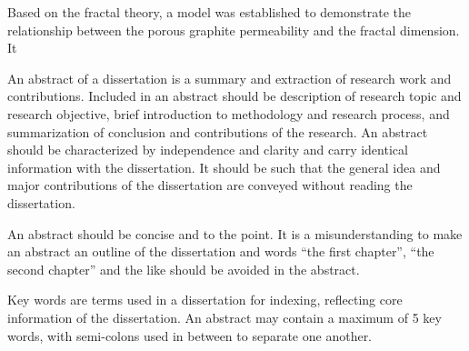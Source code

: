 \begin{eabstract}
Based on the fractal theory, a model was established to demonstrate the relationship between the porous graphite permeability and the fractal dimension. It 
   
   
   An abstract of a dissertation is a summary and extraction of research work
   and contributions. Included in an abstract should be description of research
   topic and research objective, brief introduction to methodology and research
   process, and summarization of conclusion and contributions of the
   research. An abstract should be characterized by independence and clarity and
   carry identical information with the dissertation. It should be such that the
   general idea and major contributions of the dissertation are conveyed without
   reading the dissertation.

   An abstract should be concise and to the point. It is a misunderstanding to
   make an abstract an outline of the dissertation and words ``the first
   chapter'', ``the second chapter'' and the like should be avoided in the
   abstract.

   Key words are terms used in a dissertation for indexing, reflecting core
   information of the dissertation. An abstract may contain a maximum of 5 key
   words, with semi-colons used in between to separate one another.
\end{eabstract}
